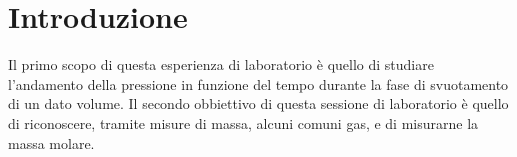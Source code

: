 \section{Introduzione}

Il primo scopo di questa esperienza di laboratorio è quello di studiare l'andamento della pressione
in funzione del tempo durante la fase di svuotamento di un dato volume.\newline
Il secondo obbiettivo di
questa sessione di laboratorio è quello di riconoscere, tramite misure di massa, alcuni comuni gas,
e di misurarne la massa molare.
